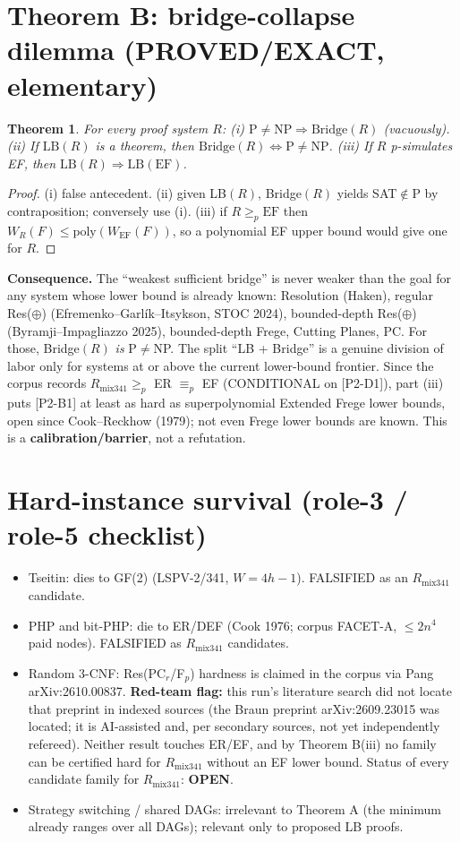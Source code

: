 \documentclass[11pt]{article}
\newtheorem{theorem}{Theorem}
\begin{document}
\section{Theorem B: bridge-collapse dilemma (PROVED/EXACT, elementary)}
\begin{theorem}
For every proof system $R$: (i) $\mathrm{P}\ne\mathrm{NP}\Rightarrow
\mathrm{Bridge}(R)$ (vacuously). (ii) If $\mathrm{LB}(R)$ is a theorem, then
$\mathrm{Bridge}(R)\iff \mathrm{P}\ne\mathrm{NP}$. (iii) If $R$ p-simulates EF,
then $\mathrm{LB}(R)\Rightarrow\mathrm{LB}(\mathrm{EF})$.
\end{theorem}
\begin{proof}
(i) false antecedent. (ii) given LB$(R)$, Bridge$(R)$ yields SAT$\notin$P by
contraposition; conversely use (i). (iii) if $R\ge_p\mathrm{EF}$ then
$W_R(F)\le\mathrm{poly}(W_{\mathrm{EF}}(F))$, so a polynomial EF upper bound
would give one for $R$.
\end{proof}
\noindent\textbf{Consequence.} The ``weakest sufficient bridge'' is never weaker
than the goal for any system whose lower bound is already known: Resolution
(Haken), regular Res($\oplus$) (Efremenko--Garl\'ik--Itsykson, STOC 2024),
bounded-depth Res($\oplus$) (Byramji--Impagliazzo 2025), bounded-depth Frege,
Cutting Planes, PC. For those, Bridge$(R)$ \emph{is} P$\ne$NP. The split
``LB + Bridge'' is a genuine division of labor only for systems at or above the
current lower-bound frontier. Since the corpus records
$R_{\mathrm{mix341}}\ge_p$ ER $\equiv_p$ EF (CONDITIONAL on [P2-D1]),
part (iii) puts [P2-B1] at least as hard as superpolynomial Extended Frege
lower bounds, open since Cook--Reckhow (1979); not even Frege lower bounds are
known. This is a \textbf{calibration/barrier}, not a refutation.

\section{Hard-instance survival (role-3 / role-5 checklist)}
\begin{itemize}
\item Tseitin: dies to GF(2) (LSPV-2/341, $W=4h-1$). FALSIFIED as an
$R_{\mathrm{mix341}}$ candidate.
\item PHP and bit-PHP: die to ER/DEF (Cook 1976; corpus FACET-A, $\le 2n^4$
paid nodes). FALSIFIED as $R_{\mathrm{mix341}}$ candidates.
\item Random 3-CNF: Res(PC$_r$/F$_p$) hardness is claimed in the corpus via
Pang arXiv:2610.00837. \textbf{Red-team flag:} this run's literature search did
not locate that preprint in indexed sources (the Braun preprint arXiv:2609.23015
was located; it is AI-assisted and, per secondary sources, not yet
independently refereed). Neither result touches ER/EF, and by Theorem B(iii) no
family can be certified hard for $R_{\mathrm{mix341}}$ without an EF lower bound.
Status of every candidate family for $R_{\mathrm{mix341}}$: \textbf{OPEN}.
\item Strategy switching / shared DAGs: irrelevant to Theorem A (the minimum
already ranges over all DAGs); relevant only to proposed LB proofs.
\end{itemize}
\end{document}
